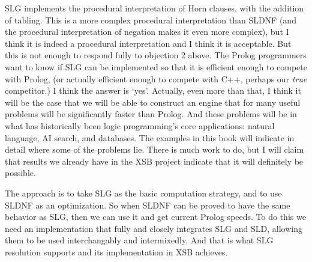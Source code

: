 SLG implements the procedural interpretation of Horn clauses, with the
addition of tabling.  This is a more complex procedural interpretation
than SLDNF (and the procedural interpretation of negation makes it
even more complex), but I think it is indeed a procedural
interpretation and I think it is acceptable.  But this is not enough
to respond fully to objection 2 above.  The Prolog programmers want to
know if SLG can be implemented so that it is efficient enough to
compete with Prolog, (or actually efficient enough to compete with
C++, perhaps our {\em true} competitor.)  I think the answer is `yes'.
Actually, even more than that, I think it will be the case that we
will be able to construct an engine that for many useful problems will
be significantly faster than Prolog.  And these problems will be in
what has historically been logic programming's core applications:
natural language, AI search, and databases.  The examples in this book
will indicate in detail where some of the problems lie.  There is much
work to do, but I will claim that results we already have in the XSB
project indicate that it will definitely be possible.

The approach is to take SLG as the basic computation strategy, and to
use SLDNF as an optimization.  So when SLDNF can be proved to have the
same behavior as SLG, then we can use it and get current Prolog
speeds.  To do this we need an implementation that fully and closely
integrates SLG and SLD, allowing them to be used interchangably and
intermixedly.  And that is what SLG resolution supports and its
implementation in XSB achieves.
